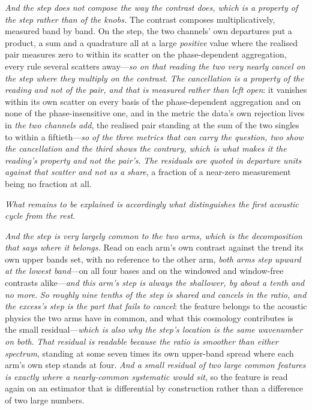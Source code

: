 \documentclass[11pt,a4paper]{article}
\theoremstyle{plain}
\theoremstyle{definition}
\theoremstyle{remark}
\begin{document}
\emph{And the step does not compose the way the contrast does, which is a property of the step rather than of
the knobs.} The contrast composes multiplicatively, measured band by band. On the step, the two channels' own
departures put a product, a sum and a quadrature all at a large \emph{positive} value where the realised pair
measures zero to within its scatter on the phase-dependent aggregation, every rule several scatters
away---\emph{so on that reading the two very nearly cancel on the step where they multiply on the contrast}.
\emph{The cancellation is a property of the reading and not of the pair, and that is measured rather than
left open}: it vanishes within its own scatter on every basis of the phase-dependent aggregation and on none
of the phase-insensitive one, and in the metric the data's own rejection lives in \emph{the two channels add},
the realised pair standing at the sum of the two singles to within a fiftieth---\emph{so of the three metrics
that can carry the question, two show the cancellation and the third shows the contrary, which is what makes it
the reading's property and not the pair's}. \emph{The
residuals are quoted in departure units against that scatter and not as a share}, a fraction of a near-zero
measurement being no fraction at
all.

\emph{What remains to be explained is accordingly what distinguishes the first acoustic cycle from the
rest}.

\emph{And the step is very largely common to the two arms, which is the decomposition that says where it
belongs.} Read on each arm's own contrast against the trend its own upper bands set, with no reference to
the other arm, \emph{both arms step upward at the lowest band}---on all four bases and on the windowed and
window-free contrasts alike---\emph{and this arm's step is always the shallower, by about a tenth and no
more}. \emph{So roughly nine tenths of the step is shared and cancels in the ratio, and the excess's step is
the part that fails to cancel}: the feature belongs to the acoustic physics the two arms have in common, and
what this cosmology contributes is the small residual---\emph{which is also why the step's location is the
same wavenumber on both}. \emph{That residual is readable because the ratio is smoother than either spectrum},
standing at some seven times its own upper-band spread where each arm's own step stands at four. \emph{And a small residual of two large common features is exactly where a nearly-common
systematic would sit}, so the feature is read again on an estimator that is differential by construction
rather than a difference of two large
numbers.
\end{document}
